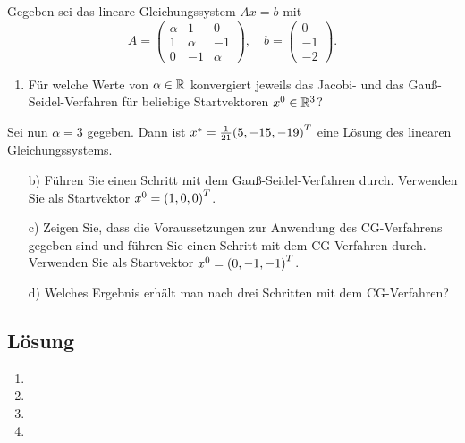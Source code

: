 \documentclass{exercise}
\begin{document}
    \begin{problem}
        Gegeben sei das lineare Gleichungssystem \(Ax = b\) mit
        \[
            A = \begin{pmatrix}
                \alpha & 1 & 0\\
                1 & \alpha & -1\\
                0 & -1 & \alpha
            \end{pmatrix}, \quad b = \begin{pmatrix}
                0\\
                -1\\
                -2
            \end{pmatrix}.
        \]
        \begin{enumerate}
            \item Für welche Werte von \(\alpha \in \R\) konvergiert jeweils das Jacobi- und das Gauß-Seidel-Verfahren für beliebige Startvektoren \(x^0 \in \R^3\)?
        \end{enumerate}
        Sei nun \(\alpha = 3\) gegeben.
        Dann ist \(x^* = \frac{1}{21}\parentheses*{5, -15, -19}^T\) eine Lösung des linearen Gleichungssystems.
        \begin{enumerate}
            \item[b)] Führen Sie einen Schritt mit dem Gauß-Seidel-Verfahren durch.
            Verwenden Sie als Startvektor \(x^0 = \parentheses*{1, 0, 0}^T\).
            \item[c)] Zeigen Sie, dass die Voraussetzungen zur Anwendung des CG-Verfahrens gegeben sind und führen Sie einen Schritt mit dem CG-Verfahren durch.
            Verwenden Sie als Startvektor \(x^0 = \parentheses*{0, -1, -1}^T\).
            \item[d)] Welches Ergebnis erhält man nach drei Schritten mit dem CG-Verfahren?
        \end{enumerate}
    \end{problem}
    
    \subsection*{Lösung}
    \begin{enumerate}
        \item
        \item
        \item
        \item
    \end{enumerate}
\end{document}
